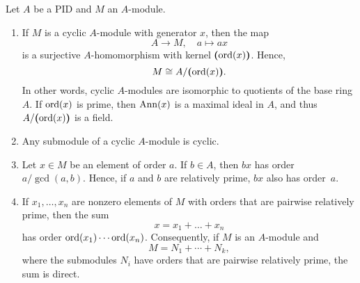 \begin{thm}\label{thm:cyclic-modules-over-PID}
    Let\/ $A$ be a PID and\/ $M$ an $A$-module.

\begin{enumerate}[\rm a)]
    \item If\/ $M$ is a cyclic\/ $A$-module with generator\/ $x$, then the map
   $$
       A \to M, \quad a \mapsto a x
   $$
   is a surjective\/ $A$-homomorphism with kernel\/ $\textrm{\boldmath$($}\!\operatorname{ord}(x)\textrm{\boldmath$)$}$. Hence,
   $$
       M \cong A/\textrm{\boldmath$($}\!\operatorname{ord}(x)\textrm{\boldmath$)$}.
   $$
   In other words, cyclic\/ $A$-modules are isomorphic to quotients of the base ring\/ $A$. If\/ $\operatorname{ord}(x)$ is prime, then\/ $\operatorname{\operatorname{Ann}}(x)$ is a maximal ideal in\/ $A$, and thus\/ $A/\textrm{\boldmath$($}\!\operatorname{ord}(x)\textrm{\boldmath$)$}$ is a field.

    \item Any submodule of a cyclic\/ $A$-module is cyclic.

    \item Let\/ $x\in M$ be an element of order\/ $a$. If\/ $b \in A$, then\/ $bx$ has order\/ $a/\gcd(a,b)$. Hence, if\/ $a$ and\/ $b$ are relatively prime, $bx$ also has order\/~$a$.

    \item If\/ $x_1, \dots, x_n$ are nonzero elements of\/ $M$ with orders that are pairwise relatively prime, then the sum
   $$
       x = x_1 + \dots + x_n
   $$
   has order\/ $\operatorname{ord}(x_1)\cdots\operatorname{ord}(x_n)$. Consequently, if\/ $M$ is an\/ $A$-module and
   $$
       M = N_1+\cdots+N_k,
   $$
   where the submodules\/ $N_i$ have orders that are pairwise relatively prime, the sum is direct.
\end{enumerate}
\end{thm}

